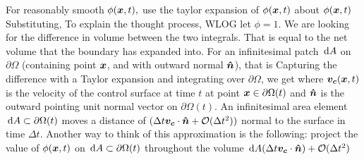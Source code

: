 For reasonably smooth  $\phi(\boldsymbol{x},t),$ use the taylor expansion of $\phi(\boldsymbol{x},t)$ about $\phi(\boldsymbol{x},t)$
Substituting,
To explain the thought process, WLOG let $\phi=1$. We are looking for the difference in volume between the two integrals. That is equal to the net volume that the boundary has expanded into. For an infinitesimal patch $\,\mathrm{d} A$ on $\partial\Omega$ (containing point $\boldsymbol{x}$, and with outward normal $\boldsymbol{\hat{n}}$), that is
Capturing the difference with a Taylor expansion and integrating over $\partial\Omega$, we get
where $\boldsymbol{v_c}(\boldsymbol{x},t)$ is the velocity of the control surface at time $t$ at point $\boldsymbol{x}\in\partial\Omega(t)$ and $\boldsymbol{\hat{n}}$ is the outward pointing unit normal vector on $\partial\Omega(t)$. An infinitesimal area element $\,\mathrm{d} A\subset\partial\Omega(t)$ moves a distance of $(\Delta t\boldsymbol{v_c}\cdot\boldsymbol{\hat{n}}+\mathcal{O}(\Delta t^2))$ normal to the surface in time $\Delta t.$ Another way to think of this approximation is the following: project the value of $\phi(\boldsymbol{x},t)$ on $\,\mathrm{d} A\subset\partial\Omega(t)$ throughout the volume $\,\mathrm{d} A(\Delta t\boldsymbol{v_c}\cdot\boldsymbol{\hat{n}})+\mathcal{O}(\Delta t^2)$
